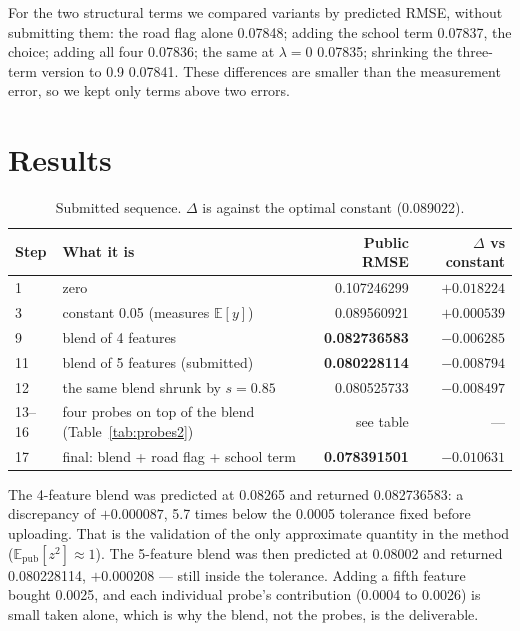 \documentclass[a4paper]{article}
\begin{document}
For the two structural terms we compared variants by predicted RMSE, without submitting them: the road
flag alone \num{0.07848}; adding the school term \num{0.07837}, the choice; adding all four \num{0.07836};
the same at $\lambda=0$ \num{0.07835}; shrinking the three-term version to 0.9 \num{0.07841}. These
differences are smaller than the measurement error, so we kept only terms above two errors.

\section{Results}

\begin{table}[htbp]
\centering
\small
\caption{Submitted sequence. $\Delta$ is against the optimal constant (\num{0.089022}).}
\begin{tabular}{llrr}
\toprule
Step & What it is & Public RMSE & $\Delta$ vs constant \\
\midrule
1 & zero & 0.107246299 & $+0.018224$ \\
3 & constant 0.05 (measures $\mathbb{E}[y]$) & 0.089560921 & $+0.000539$ \\
9 & blend of 4 features & \textbf{0.082736583} & $-0.006285$ \\
11 & blend of 5 features (submitted) & \textbf{0.080228114} & $-0.008794$ \\
12 & the same blend shrunk by $s=0.85$ & 0.080525733 & $-0.008497$ \\
13--16 & four probes on top of the blend (Table~\ref{tab:probes2}) & see table & --- \\
17 & final: blend + road flag + school term & \textbf{0.078391501} & $-0.010631$ \\
\bottomrule
\end{tabular}
\end{table}

The 4-feature blend was predicted at \num{0.08265} and returned \num{0.082736583}: a
discrepancy of $+\num{0.000087}$, 5.7 times below the \num{0.0005} tolerance fixed before
uploading. That is the validation of the only approximate quantity in the method
($\mathbb{E}_{\text{pub}}[z^2]\approx1$). The 5-feature blend was then predicted at
\num{0.08002} and returned \num{0.080228114}, $+\num{0.000208}$ --- still inside the
tolerance. Adding a fifth feature bought \num{0.0025}, and each individual probe's contribution (\num{0.0004} to \num{0.0026})
is small taken alone, which is why the blend, not the probes, is the deliverable.
\end{document}
